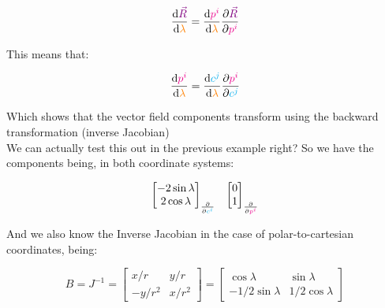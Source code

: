 \begin{equation}
    \frac{\dd \begingroup\color{violet}\vec{R}\endgroup}{\dd \begingroup\color{orange}\lambda\endgroup} = 
    \frac{\dd \begingroup\color{magenta}p^i\endgroup}{\dd \begingroup\color{orange}\lambda\endgroup}
    \frac{\partial \begingroup\color{violet}\vec{R}\endgroup}{\partial \begingroup\color{magenta}p^i\endgroup}
\end{equation}

This means that:

\begin{equation}
    \frac{\dd \begingroup\color{magenta}p^i\endgroup}{\dd \begingroup\color{orange}\lambda\endgroup} = 
    \frac{\dd \begingroup\color{cyan}c^j\endgroup}{\dd \begingroup\color{orange}\lambda\endgroup} \frac{\partial \begingroup\color{magenta}p^i\endgroup}{\partial \begingroup\color{cyan}c^j\endgroup}
\end{equation}

Which shows that the vector field components transform using the backward transformation (inverse Jacobian)\\

We can actually test this out in the previous example right?
So we have the components being, in both coordinate systems:

\begin{align*}
    \begin{bmatrix}
        -2\sin\lambda\\
        2 \cos\lambda
    \end{bmatrix}_{\frac{\partial }{\partial \begingroup\color{cyan}c^i\endgroup}} &&
    \begin{bmatrix}
        0\\
        1
    \end{bmatrix}_{\frac{\partial }{\partial \begingroup\color{magenta}p^i\endgroup}}
\end{align*}

And we also know the Inverse Jacobian in the case of polar-to-cartesian coordinates, being:

\begin{equation}
    B = J^{-1} =
    \begin{bmatrix}
        x/r & y/r\\
        -y/r^2 & x/r^2
    \end{bmatrix} = 
    \begin{bmatrix}
        \cos\lambda & \sin\lambda\\
        -1/2\sin\lambda & 1/2\cos\lambda
    \end{bmatrix}
\end{equation}

